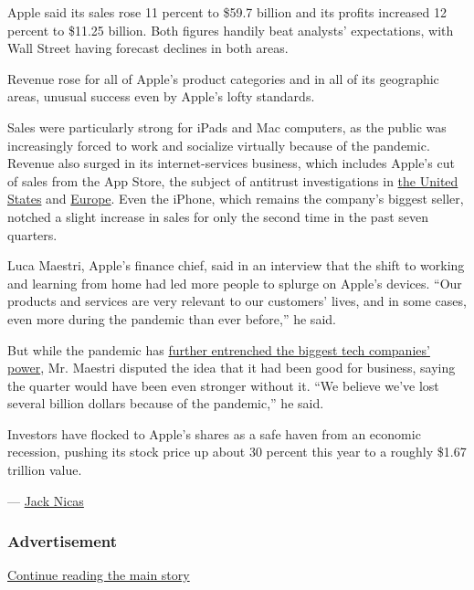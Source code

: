 Apple said its sales rose 11 percent to \$59.7 billion and its profits
increased 12 percent to \$11.25 billion. Both figures handily beat
analysts' expectations, with Wall Street having forecast declines in
both areas.

Revenue rose for all of Apple's product categories and in all of its
geographic areas, unusual success even by Apple's lofty standards.

Sales were particularly strong for iPads and Mac computers, as the
public was increasingly forced to work and socialize virtually because
of the pandemic. Revenue also surged in its internet-services business,
which includes Apple's cut of sales from the App Store, the subject of
antitrust investigations in
\href{https://www.nytimes3xbfgragh.onion/2020/07/28/technology/amazon-apple-facebook-google-antitrust-hearing.html}{the
United States} and
\href{https://www.nytimes3xbfgragh.onion/2020/06/16/business/apple-app-store-european-union-antitrust.html}{Europe}.
Even the iPhone, which remains the company's biggest seller, notched a
slight increase in sales for only the second time in the past seven
quarters.

Luca Maestri, Apple's finance chief, said in an interview that the shift
to working and learning from home had led more people to splurge on
Apple's devices. ``Our products and services are very relevant to our
customers' lives, and in some cases, even more during the pandemic than
ever before,'' he said.

But while the pandemic has
\href{https://www.nytimes3xbfgragh.onion/2020/03/23/technology/coronavirus-facebook-amazon-youtube.html}{further
entrenched the biggest tech companies' power}, Mr. Maestri disputed the
idea that it had been good for business, saying the quarter would have
been even stronger without it. ``We believe we've lost several billion
dollars because of the pandemic,'' he said.

Investors have flocked to Apple's shares as a safe haven from an
economic recession, pushing its stock price up about 30 percent this
year to a roughly \$1.67 trillion value.

--- \href{https://www.nytimes3xbfgragh.onion/by/jack-nicas}{Jack Nicas}

\hypertarget{advertisement-1}{%
\subsubsection{Advertisement}\label{advertisement-1}}

\protect\hyperlink{after-dfp-ad-mid2}{Continue reading the main story}

